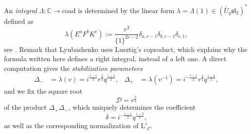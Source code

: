 \documentclass[a4paper,reqno]{amsart}
\theoremstyle{definition}
\theoremstyle{remark}
\newcommand{\C}{\mathbb{C}}
\newcommand{\rmL}{\mathrm{L}}
\newcommand{\calC}{\mathcal{C}}
\newcommand{\calD}{\mathcal{D}}
\newcommand{\coad}{\mathrm{coad}}
\newcommand{\fsl}{\mathfrak{sl}}
\begin{document}
An \textit{integral} $\Lambda : \C \to \coad$ is determined by the linear form $\lambda = \Lambda(1) \in (\bar{U}_q \fsl_2)^*$ defined as
\[
 \lambda \left( E^a F^b K^c \right) := \frac{r^3}{\{ 1 \}^{2r-2}} \delta_{a,r-1} \delta_{b,r-1} \delta_{c,1},
\]
see \cite[Prop.~A.5.1]{L94}. Remark that Lyubashenko uses Lusztig's coproduct, which explains why the formula written here defines a right integral, instead of a left one. A direct computation gives the \textit{stabilization parameters}
\begin{align*}
 \Delta_- &= \lambda(v) = i^{\frac{r-1}{2}} r^{\frac 32} q^{\frac{r+3}{2}}, &
 \Delta_+ &= \lambda(v^{-1}) = i^{-\frac{r-1}{2}} r^{\frac 32} q^{\frac{r-3}{2}},
\end{align*}
and we fix the square root
\[
 \calD = r^{\frac 32}
\]
of the product $\Delta_+ \Delta_-$, which uniquely determines the coefficient
\[
 \delta = i^{-\frac{r-1}{2}} q^{\frac{r-3}{2}},
\]
as well as the corresponding normalization of $\rmL'_\calC$. 
\end{document}
